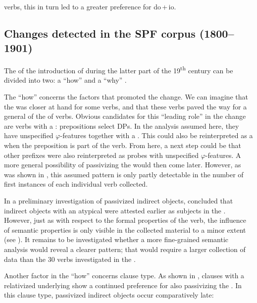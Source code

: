 \documentclass[output=paper]{langscibook}
\begin{document}
 verbs, this in turn led to a greater preference for do\,+\,io.

\subsection{Changes detected in the SPF corpus (1800–1901)}\label{sec:falk:5.2}


The  of the introduction of  during the latter part of the 19\textsuperscript{th} century can be divided into two: a “how”  and a “why” .


The “how”  concerns the factors that promoted the change. We can imagine that the  was closer at hand for some verbs, and that these verbs paved the way for a general  of the  of  verbs. Obvious candidates for this “leading role” in the change are verbs with a : prepositions select DPs. In the analysis assumed here, they have unspecified $\varphi ${}-features together with a . This  could also be reinterpreted as a  when the preposition is part of the verb. From here, a next step could be that other prefixes were also reinterpreted as probes with unspecified $\varphi ${}-features. A more general possibility of passivizing the  would then come later. However, as was shown in , this assumed pattern is only partly detectable in the number of first instances of each individual verb collected.



In a preliminary investigation of passivized indirect objects, \citet{Falk1995,Falk1997} concluded that indirect objects with an atypical  were attested earlier as subjects in the . However, just as with respect to the formal properties of the verb, the influence of semantic properties is only visible in the collected material to a minor extent (see ). It remains to be investigated whether a more fine-grained semantic analysis would reveal a clearer pattern; that would require a larger collection of data than the 30 verbs investigated in the .



Another factor in the “how”  concerns clause type. As shown in , clauses with a relativized underlying  show a continued preference for also passivizing the . In this clause type, passivized indirect objects occur comparatively late:
\end{document}

